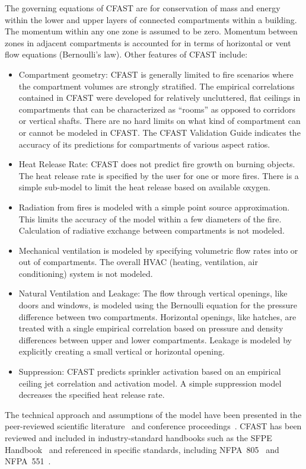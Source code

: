 \documentclass[12pt,twoside]{book}
\begin{document}
The governing equations of CFAST are for conservation of mass and energy within the lower and upper layers of connected compartments within a building. The momentum within any one zone is assumed to be zero.  Momentum between zones in adjacent compartments is accounted for in terms of horizontal or vent flow equations (Bernoulli's law). Other features of CFAST include:
\begin{itemize}
\item Compartment geometry: CFAST is generally limited to fire scenarios where the compartment volumes are strongly stratified. The empirical correlations contained in CFAST were developed for relatively uncluttered, flat ceilings in compartments that can be characterized as ``rooms'' as opposed to corridors or vertical shafts. There are no hard limits on what kind of compartment can or cannot be modeled in CFAST. The CFAST Validation Guide indicates the accuracy of its predictions for compartments of various aspect ratios.
\item Heat Release Rate: CFAST does not predict fire growth on burning objects. The heat release rate is specified by the user for one or more fires. There is a simple sub-model to limit the heat release based on available oxygen.
\item Radiation from fires is modeled with a simple point source approximation.  This limits the accuracy of the model within a few diameters of the fire. Calculation of radiative exchange between compartments is not modeled.
\item Mechanical ventilation is modeled by specifying volumetric flow rates into or out of compartments. The overall HVAC (heating, ventilation, air conditioning) system is not modeled.
\item Natural Ventilation and Leakage: The flow through vertical openings, like doors and windows, is modeled using the Bernoulli equation for the pressure difference between two compartments. Horizontal openings, like hatches, are treated with a single empirical correlation based on pressure and density differences between upper and lower compartments. Leakage is modeled by explicitly creating a small vertical or horizontal opening.
\item Suppression: CFAST predicts sprinkler activation based on an empirical ceiling jet correlation and activation model. A simple suppression model decreases the specified heat release rate.
\end{itemize}
The technical approach and assumptions of the model have been presented in the peer-reviewed scientific literature~\cite{Jones:1993a, Jones:1985, Jones:1984} and conference proceedings~\cite{Jones:1991}. CFAST has been reviewed and included in industry-standard handbooks such as the SFPE Handbook~\cite{Walton:2003} and referenced in specific standards, including NFPA~805~\cite{NFPA805:2004} and NFPA~551~\cite{NFPA551:2004}.
\end{document}
